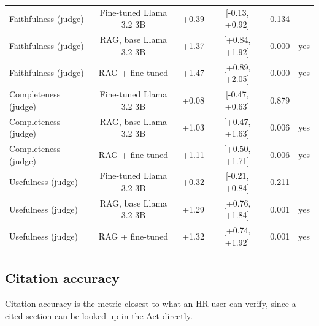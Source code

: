 \documentclass[11pt,a4paper]{article}
\begin{document}
\begin{table}[htbp]
{\begin{tabular}{@{}lccccc@{}}
Faithfulness (judge) & Fine-tuned Llama 3.2 3B & +0.39 & [-0.13, +0.92] & 0.134 &  \\
Faithfulness (judge) & RAG, base Llama 3.2 3B & +1.37 & [+0.84, +1.92] & 0.000 & yes \\
Faithfulness (judge) & RAG + fine-tuned & +1.47 & [+0.89, +2.05] & 0.000 & yes \\
Completeness (judge) & Fine-tuned Llama 3.2 3B & +0.08 & [-0.47, +0.63] & 0.879 &  \\
Completeness (judge) & RAG, base Llama 3.2 3B & +1.03 & [+0.47, +1.63] & 0.006 & yes \\
Completeness (judge) & RAG + fine-tuned & +1.11 & [+0.50, +1.71] & 0.006 & yes \\
Usefulness (judge) & Fine-tuned Llama 3.2 3B & +0.32 & [-0.21, +0.84] & 0.211 &  \\
Usefulness (judge) & RAG, base Llama 3.2 3B & +1.29 & [+0.76, +1.84] & 0.001 & yes \\
Usefulness (judge) & RAG + fine-tuned & +1.32 & [+0.74, +1.92] & 0.001 & yes \\
\bottomrule
\end{tabular}}
\end{table}

\subsection{Citation accuracy}
Citation accuracy is the metric closest to what an HR user can verify, since a cited section can be looked up in the Act directly.
\begin{table}[htbp]
\centering
\renewcommand{\arraystretch}{1.15}
\caption{Citation behaviour on the scenario set, the subset for which gold section numbers are complete (38/38 items). ``Valid'' means the cited section exists in the Act; F1 is against the gold sections for the question. Citation F1 is defined only where a gold section exists, so on the hold-out set it is a mean over the 15 of 146 items that carry one. Hold-out citation F1 is reported elsewhere in the paper on that basis and should be read against that sample size, not against the full set.}
\label{tab:citation}
\small
{}
\end{table}
\end{document}
